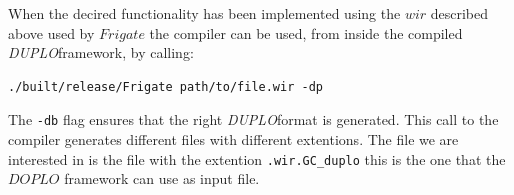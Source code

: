 \documentclass[twoside,11pt,openright]{report}
\newcommand{\DUPLO}{\textit{DUPLO}}
\begin{document}
When the decired functionality has been implemented using the $wir$ described above used by $Frigate$ the compiler can be used, from inside the compiled \DUPLO framework, by calling:

\begin{center}
\begin{verbatim}
./built/release/Frigate path/to/file.wir -dp
\end{verbatim}
\end{center}

The \verb|-db| flag ensures that the right \DUPLO format is generated. This call to the compiler generates different files with different extentions. The file we are interested in is the file with the extention \verb|.wir.GC_duplo| this is the one that the $DOPLO$ framework can use as input file.

\bigskip
\end{document}
